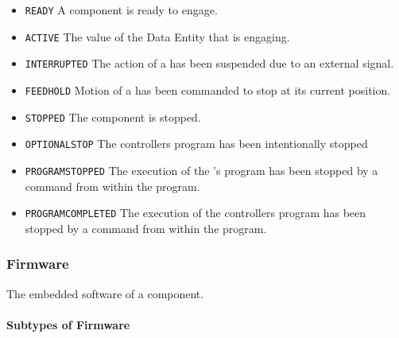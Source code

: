 \begin{itemize}
\item \texttt{READY} \newline A component is ready to engage. 
\item \texttt{ACTIVE} \newline The value of the \gls{Data Entity} that is engaging. 
\item \texttt{INTERRUPTED} \newline The action of a  has been suspended due to an external signal. 
\item \texttt{FEED\textunderscore HOLD} \newline Motion of a  has been commanded to stop at its current position. 
\item \texttt{STOPPED} \newline The component is stopped. 
\item \texttt{OPTIONAL\textunderscore STOP} \newline The controllers program has been intentionally stopped 
\item \texttt{PROGRAM\textunderscore STOPPED} \newline The execution of the 's program has been stopped by a command from within the program. 
\item \texttt{PROGRAM\textunderscore COMPLETED} \newline The execution of the controllers program has been stopped by a command from within the program. 
\end{itemize}

\FloatBarrier

\subsubsection{Firmware}
\label{sec:Firmware}



The embedded software of a component.


\paragraph{Subtypes of Firmware}\mbox{}
\label{sec:Subtypes of Firmware}

